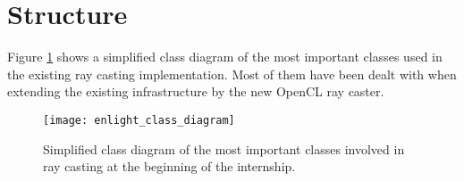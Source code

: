 \section{Structure}

Figure \ref{fig:enlight_class_diagram} shows a simplified class diagram of the most important classes used in the existing ray casting implementation. Most of them have been dealt with when extending the existing infrastructure by the new OpenCL ray caster.

\begin{figure}[h]
\centering
\texttt{[image: enlight\_class\_diagram]}
\caption{Simplified class diagram of the most important classes involved in ray casting at the beginning of the internship.}
\label{fig:enlight_class_diagram}
\end{figure}

